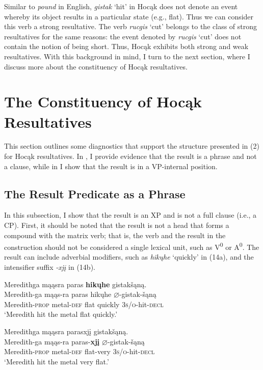 \documentclass[output=paper]{LSP/langsci}
\begin{document}
Similar to \textit{pound} in English, \textit{gistak} `hit' in Hocąk does not denote an event whereby its object results in a particular state (e.g., flat). Thus we can consider this verb a strong resultative. The verb \textit{rucgis} `cut' belongs to the class of strong resultatives for the same reasons: the event denoted by \textit{rucgis} `cut' does not contain the notion of being short. Thus, Hocąk exhibits both strong and weak resultatives. With this background in mind, I turn to the next section, where I discuss more about the constituency of Hocąk resultatives.

\section{The Constituency of Hocąk Resultatives}

This section outlines some diagnostics that support the structure presented in (2) for Hocąk resultatives. In , I provide evidence that the result is a phrase and not a clause, while in  I show that the result is in a VP-internal position.

\subsection{The Result Predicate as a Phrase}

In this subsection, I show that the result is an XP and is not a full clause (i.e., a CP). First, it should be noted that the result is not a head that forms a compound with the matrix verb; that is, the verb and the result in the construction should not be considered a single lexical unit, such as V\textsuperscript{0} or A\textsuperscript{0}. The result can include adverbial modifiers, such as \textit{hikųhe} `quickly' in (14a), and the intensifier suffix \textit{-xjį} in (14b).

\begin{exe}
\ex
\begin{xlist}

\ex \glll Meredithga mąąsra paras \textbf{hikųhe} gistakšąną. \\
 Meredith-ga mąąs-ra paras hikųhe {$\varnothing$}-gistak-šąną\\
Meredith-\textsc{prop} metal-\textsc{def} flat quickly \textsc{3s/o}-hit-\textsc{decl}\\ 
\glt `Meredith hit the metal flat quickly.'


\ex \glll Meredithga mąąsra parasxjį gistakšąną.\\
 Meredith-ga mąąs-ra paras-\textbf{xjį} {$\varnothing$}-gistak-šąną\\
Meredith-\textsc{prop} metal-\textsc{def} flat-very  \textsc{3s/o}-hit-\textsc{decl}\\
\glt `Meredith hit the metal very flat.'

\end{xlist}
\end{exe}
\end{document}
